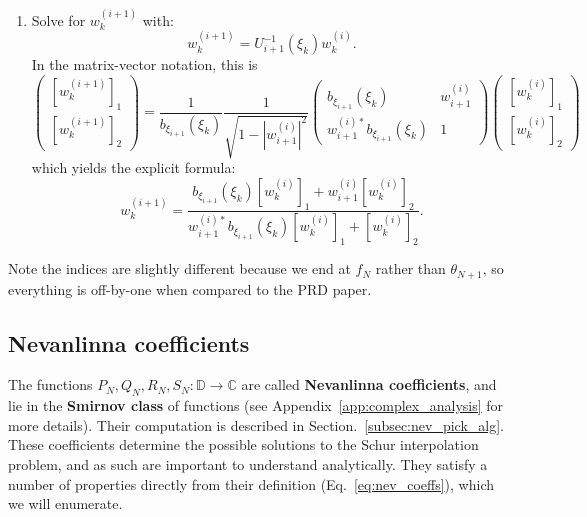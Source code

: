 \begin{enumerate}
    \item Solve for $w_{k}^{(i+1)}$ with:
    \begin{equation}
        w_k^{(i+1)} = U_{i+1}^{-1}(\xi_k) w_k^{(i)}.
    \end{equation}
    In the matrix-vector notation, this is
    \begin{equation}
        \begin{pmatrix}
            [w_k^{(i+1)}]_1 \\ 
 [w_k^{(i+1)}]_2
        \end{pmatrix}
        = \frac{1}{b_{\xi_{i+1}}(\xi_k)} \frac{1}{\sqrt{1 - |w_{i+1}^{(i)}|^2}} 
 \begin{pmatrix}
            b_{\xi_{i+1}}(\xi_k) & w_{i+1}^{(i)}  \\ 
            w_{i+1}^{(i)*}b_{\xi_{i+1}}(\xi_k) & 1
        \end{pmatrix}
                \begin{pmatrix}
            [w_k^{(i)}]_1 \\ 
 [w_k^{(i)}]_2
        \end{pmatrix}
    \end{equation}
    which yields the explicit formula:
    \begin{equation}
        w_k^{(i+1)} = \frac{b_{\xi_{i+1}}(\xi_k) [w_k^{(i)}]_1 + w_{i+1}^{(i)} [w_k^{(i)}]_2}{ w_{i+1}^{(i)*} b_{\xi_{i+1}}(\xi_k) [w_k^{(i)}]_1 + [w_k^{(i)}]_2 }.
    \end{equation}
\end{enumerate}

{\color{red}Note the indices are slightly different because we end at $f_N$ rather than $\theta_{N+1}$, so everything is off-by-one when compared to the PRD paper}. 


\subsection{Nevanlinna coefficients}

The functions $P_N, Q_N, R_N, S_N : \mathbb D\rightarrow\mathbb C$ are called \textbf{Nevanlinna coefficients}, and lie in the \textbf{Smirnov class} of functions (see Appendix~\ref{app:complex_analysis} for more details). Their computation is described in Section.~\ref{subsec:nev_pick_alg}. These coefficients determine the possible solutions to the Schur interpolation problem, and as such are important to understand analytically. They satisfy a number of properties directly from their definition (Eq.~\eqref{eq:nev_coeffs}), which we will enumerate. 

